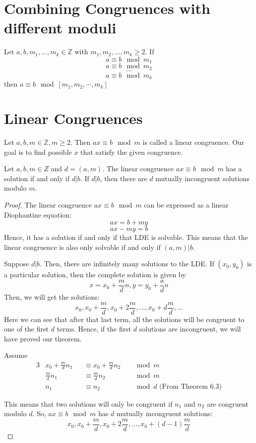 \documentclass[12pt,letterpaper]{book}
\theoremstyle{definition}
\newcommand{\Z}{\mathbb{Z}}
\begin{document}
\section{Combining Congruences with different moduli}
\phantom{}
\begin{theorem}
  Let $a,b,m_1,...,m_k \in \Z$ with $m_1,m_2,...,m_k \geq 2$. If
  \[a \equiv b \mod m_1\]
  \[a \equiv b \mod m_2\]
  \[\cdots\]
  \[a \equiv b \mod m_k\]
  then $a \equiv b \mod [m_1,m_2,\cdots,m_k]$
\end{theorem}

\section{Linear Congruences}

Let $a,b,m \in \Z, m \geq 2$. Then $ax \equiv b \mod m$ is called a linear congruence. Our goal is to find possible $x$ that satisfy the given congruence.

\begin{theorem}
  Let $a,b,m \in Z$ and $d = (a,m)$. The linear congruence $ax \equiv b \mod m$ has a solution if and only if $d | b$. If $d | b$, then there are $d$ mutually incongruent solutions modulo $m$.
\end{theorem}
\begin{proof}
  The linear congruence $ax \equiv b \mod m$ can be expressed as a linear Diophantine equation:
  \[ax = b + my\]
  \[ax - my = b\]
  Hence, it has a solution if and only if that LDE is solvable. This means that the linear congruence is also only solvable if and only if $(a,m) | b$.

  Suppose $d|b$. Then, there are infinitely many solutions to the LDE. If $(x_0,y_0)$ is a particular solution, then the complete solution is given by
  \[x = x_0 + \frac{m}{d}n, y = y_0 + \frac{a}{d}n\]
  Then, we will get the solutions:
\[x_0, x_0 + \frac{m}{d}, x_0 + 2\frac{m}{d},...,x_0 + d\frac{m}{d},...\]
Here we can see that after that last term, all the solutions will be congruent to one of the first $d$ terms. Hence, if the first $d$ solutions are incongruent, we will have proved our theorem.

Assume
\begin{alignat*}{3}
  &x_0 + \frac{m}{d}n_1 &&\equiv x_0 + \frac{m}{d} n_2 &&\mod m \\
  &\frac{m}{d}n_1 &&\equiv \frac{m}{d}n_2 &&\mod m \\
  &n_1 &&\equiv n_2 &&\mod d \text{ (From Theorem 6.3)}
\end{alignat*}

This means that two solutions will only be congruent if $n_1$ and $n_2$ are congruent modulo $d$. So, $ax \equiv b \mod m$ has $d$ mutually incongruent solutions:
\[x_0,x_0 + \frac{m}{d}, x_0 + 2\frac{m}{d},..., x_0 + (d-1)\frac{m}{d}\]
\end{proof}
\end{document}
